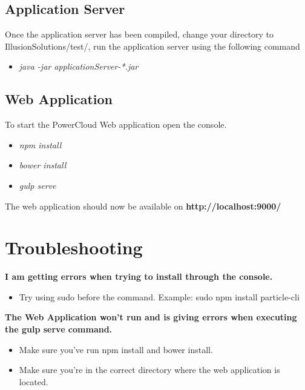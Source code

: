 \documentclass[a4paper,10pt]{article}
\begin{document}
		\subsection{Application Server}
			Once the application server has been compiled, change your directory to IllusionSolutions/test/, run the application server using the following command
			
			\begin{itemize}
				\item \textit{java -jar applicationServer-*.jar}
			\end{itemize}
			
		\subsection{Web Application}
			To start the PowerCloud Web application open the console.

			\begin{itemize}
			\item \textit{npm install}
			\item \textit{bower install}
			\item \textit{gulp serve}
			\end{itemize}
			
			The web application should now be available on \textbf{http://localhost:9000/}
			
			\newpage
	\section{Troubleshooting}
		\textbf{I am getting errors when trying to install through the console.}
			\begin{itemize}
			\item Try using sudo before the command. Example: sudo npm install particle-cli
			\end{itemize}
		
		\textbf{The Web Application won't run and is giving errors when executing the gulp serve command.} 
			\begin{itemize}
			\item Make sure you've run npm install and bower install.
			\item Make sure you're in the correct directory where the web application is located.
			\end{itemize}
\end{document}
